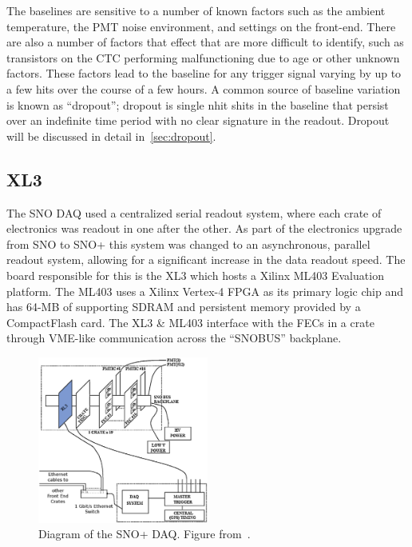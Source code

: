 The baselines are sensitive to a number of known factors such as the
ambient temperature, the PMT noise environment, and settings
on the front-end.
There are also a number of factors that effect that are more difficult
to identify, such as transistors on the CTC performing malfunctioning due to
age or other unknown factors.
These factors lead to the baseline for any trigger signal varying
by up to a few hits over the course of a few hours.
A common source of baseline variation is known as ``dropout'';
dropout is single nhit shits in the  baseline that persist over an indefinite
time period with no clear signature in the readout.
Dropout will be discussed in detail in~\ref{sec:dropout}.

\subsection{XL3}
\label{sec:xl3}
The SNO DAQ used a centralized serial readout system, where each crate of
electronics was readout in one after the other.
As part of the electronics upgrade from SNO to SNO+ this system was changed to
an asynchronous, parallel readout system, allowing for a significant increase in
the data readout speed.
The board responsible for this is the XL3 which hosts a Xilinx ML403
Evaluation platform.
The ML403 uses a Xilinx Vertex-4 FPGA as its primary logic chip and has
64-MB of supporting SDRAM and persistent memory provided by a CompactFlash
card.
The XL3 \& ML403 interface with the FECs in a crate through VME-like communication
across the ``SNOBUS'' backplane.

\begin{figure}[htbp]
    \centering
    \includegraphics[width=0.5\textwidth]{xl3_daq_diagram}
    \caption[SNO+ DAQ Diagram]{Diagram of the SNO+ DAQ\@.
    Figure from~\citep{richie_thesis}.}
\label{fig:xl3_daq_diagram}
\end{figure}


